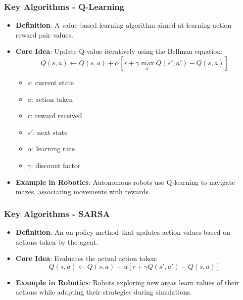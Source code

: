 \documentclass{beamer}
\begin{document}
\begin{frame}[fragile]
    \frametitle{Key Algorithms - Q-Learning}
    \begin{itemize}
        \item \textbf{Definition}: A value-based learning algorithm aimed at learning action-reward pair values.
        \item \textbf{Core Idea}: Update Q-value iteratively using the Bellman equation:
        \begin{equation}
            Q(s, a) \leftarrow Q(s, a) + \alpha \left[ r + \gamma \max_{a'} Q(s', a') - Q(s, a) \right]
        \end{equation}
        \begin{itemize}
            \item $s$: current state
            \item $a$: action taken
            \item $r$: reward received
            \item $s'$: next state
            \item $\alpha$: learning rate
            \item $\gamma$: discount factor
        \end{itemize}
        \item \textbf{Example in Robotics}: Autonomous robots use Q-learning to navigate mazes, associating movements with rewards.
    \end{itemize}
\end{frame}

\begin{frame}[fragile]
    \frametitle{Key Algorithms - SARSA}
    \begin{itemize}
        \item \textbf{Definition}: An on-policy method that updates action values based on actions taken by the agent.
        \item \textbf{Core Idea}: Evaluates the actual action taken:
        \begin{equation}
            Q(s, a) \leftarrow Q(s, a) + \alpha \left[ r + \gamma Q(s', a') - Q(s, a) \right]
        \end{equation}
        \item \textbf{Example in Robotics}: Robots exploring new areas learn values of their actions while adapting their strategies during simulations.
    \end{itemize}
\end{frame}
\end{document}
